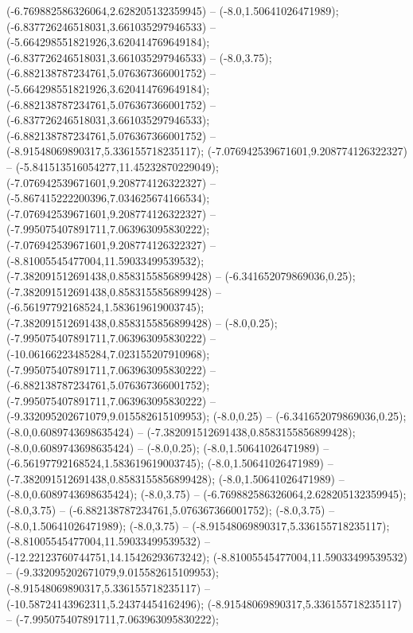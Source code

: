  (-6.769882586326064,2.628205132359945) -- (-8.0,1.50641026471989);
 (-6.837726246518031,3.661035297946533) -- (-5.664298551821926,3.620414769649184);
 (-6.837726246518031,3.661035297946533) -- (-8.0,3.75);
 (-6.882138787234761,5.076367366001752) -- (-5.664298551821926,3.620414769649184);
 (-6.882138787234761,5.076367366001752) -- (-6.837726246518031,3.661035297946533);
 (-6.882138787234761,5.076367366001752) -- (-8.91548069890317,5.336155718235117);
 (-7.076942539671601,9.208774126322327) -- (-5.841513516054277,11.45232870229049);
 (-7.076942539671601,9.208774126322327) -- (-5.867415222200396,7.034625674166534);
 (-7.076942539671601,9.208774126322327) -- (-7.995075407891711,7.063963095830222);
 (-7.076942539671601,9.208774126322327) -- (-8.81005545477004,11.59033499539532);
 (-7.382091512691438,0.8583155856899428) -- (-6.341652079869036,0.25);
 (-7.382091512691438,0.8583155856899428) -- (-6.56197792168524,1.583619619003745);
 (-7.382091512691438,0.8583155856899428) -- (-8.0,0.25);
 (-7.995075407891711,7.063963095830222) -- (-10.06166223485284,7.023155207910968);
 (-7.995075407891711,7.063963095830222) -- (-6.882138787234761,5.076367366001752);
 (-7.995075407891711,7.063963095830222) -- (-9.332095202671079,9.015582615109953);
 (-8.0,0.25) -- (-6.341652079869036,0.25);
 (-8.0,0.6089743698635424) -- (-7.382091512691438,0.8583155856899428);
 (-8.0,0.6089743698635424) -- (-8.0,0.25);
 (-8.0,1.50641026471989) -- (-6.56197792168524,1.583619619003745);
 (-8.0,1.50641026471989) -- (-7.382091512691438,0.8583155856899428);
 (-8.0,1.50641026471989) -- (-8.0,0.6089743698635424);
 (-8.0,3.75) -- (-6.769882586326064,2.628205132359945);
 (-8.0,3.75) -- (-6.882138787234761,5.076367366001752);
 (-8.0,3.75) -- (-8.0,1.50641026471989);
 (-8.0,3.75) -- (-8.91548069890317,5.336155718235117);
 (-8.81005545477004,11.59033499539532) -- (-12.22123760744751,14.15426293673242);
 (-8.81005545477004,11.59033499539532) -- (-9.332095202671079,9.015582615109953);
 (-8.91548069890317,5.336155718235117) -- (-10.58724143962311,5.24374454162496);
 (-8.91548069890317,5.336155718235117) -- (-7.995075407891711,7.063963095830222);
